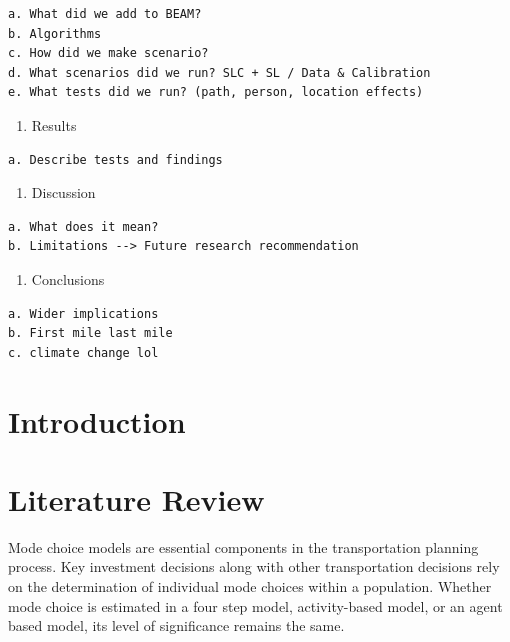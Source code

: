 \documentclass[12pt, oneside, openright]{byuthesis}
\providecommand{\tightlist}{%
  \setlength{\itemsep}{0pt}\setlength{\parskip}{0pt}}
\begin{document}
\begin{verbatim}
a. What did we add to BEAM?
b. Algorithms
c. How did we make scenario?
d. What scenarios did we run? SLC + SL / Data & Calibration
e. What tests did we run? (path, person, location effects)
\end{verbatim}

\begin{enumerate}
\def\labelenumi{\arabic{enumi}.}
\setcounter{enumi}{3}
\tightlist
\item
  Results
\end{enumerate}

\begin{verbatim}
a. Describe tests and findings
\end{verbatim}

\begin{enumerate}
\def\labelenumi{\arabic{enumi}.}
\setcounter{enumi}{4}
\tightlist
\item
  Discussion
\end{enumerate}

\begin{verbatim}
a. What does it mean?
b. Limitations --> Future research recommendation
\end{verbatim}

\begin{enumerate}
\def\labelenumi{\arabic{enumi}.}
\setcounter{enumi}{5}
\tightlist
\item
  Conclusions
\end{enumerate}

\begin{verbatim}
a. Wider implications
b. First mile last mile
c. climate change lol
\end{verbatim}

\hypertarget{introduction}{%
\chapter{Introduction}\label{introduction}}

\hypertarget{literature-review}{%
\chapter{Literature Review}\label{literature-review}}

Mode choice models are essential components in the transportation planning process. Key investment decisions along with other transportation decisions rely on the determination of individual mode choices within a population. Whether mode choice is estimated in a four step model, activity-based model, or an agent based model, its level of significance remains the same.
\end{document}
